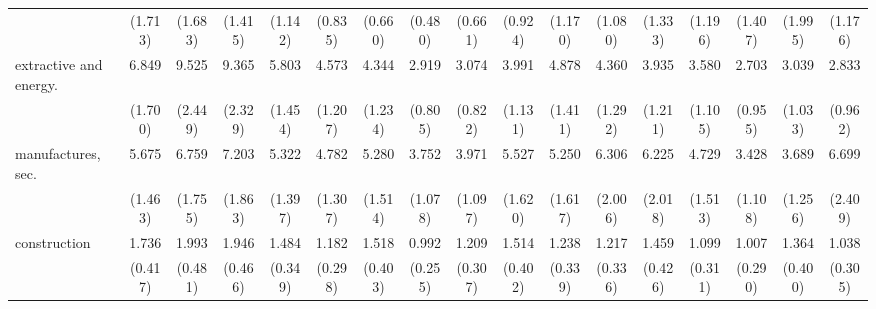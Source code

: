 {\begin{tabular}{l*{16}{c}}
                    &     (1.713)         &     (1.683)         &     (1.415)         &     (1.142)         &     (0.835)         &     (0.660)         &     (0.480)         &     (0.661)         &     (0.924)         &     (1.170)         &     (1.080)         &     (1.333)         &     (1.196)         &     (1.407)         &     (1.995)         &     (1.176)         \\
[1em]
extractive and energy.&       6.849\sym{***}&       9.525\sym{***}&       9.365\sym{***}&       5.803\sym{***}&       4.573\sym{***}&       4.344\sym{***}&       2.919\sym{***}&       3.074\sym{***}&       3.991\sym{***}&       4.878\sym{***}&       4.360\sym{***}&       3.935\sym{***}&       3.580\sym{***}&       2.703\sym{**} &       3.039\sym{**} &       2.833\sym{**} \\
                    &     (1.700)         &     (2.449)         &     (2.329)         &     (1.454)         &     (1.207)         &     (1.234)         &     (0.805)         &     (0.822)         &     (1.131)         &     (1.411)         &     (1.292)         &     (1.211)         &     (1.105)         &     (0.955)         &     (1.033)         &     (0.962)         \\
[1em]
manufactures, sec.  &       5.675\sym{***}&       6.759\sym{***}&       7.203\sym{***}&       5.322\sym{***}&       4.782\sym{***}&       5.280\sym{***}&       3.752\sym{***}&       3.971\sym{***}&       5.527\sym{***}&       5.250\sym{***}&       6.306\sym{***}&       6.225\sym{***}&       4.729\sym{***}&       3.428\sym{***}&       3.689\sym{***}&       6.699\sym{***}\\
                    &     (1.463)         &     (1.755)         &     (1.863)         &     (1.397)         &     (1.307)         &     (1.514)         &     (1.078)         &     (1.097)         &     (1.620)         &     (1.617)         &     (2.006)         &     (2.018)         &     (1.513)         &     (1.108)         &     (1.256)         &     (2.409)         \\
[1em]
construction        &       1.736\sym{*}  &       1.993\sym{**} &       1.946\sym{**} &       1.484         &       1.182         &       1.518         &       0.992         &       1.209         &       1.514         &       1.238         &       1.217         &       1.459         &       1.099         &       1.007         &       1.364         &       1.038         \\
                    &     (0.417)         &     (0.481)         &     (0.466)         &     (0.349)         &     (0.298)         &     (0.403)         &     (0.255)         &     (0.307)         &     (0.402)         &     (0.339)         &     (0.336)         &     (0.426)         &     (0.311)         &     (0.290)         &     (0.400)         &     (0.305)         \\

\end{tabular}}
